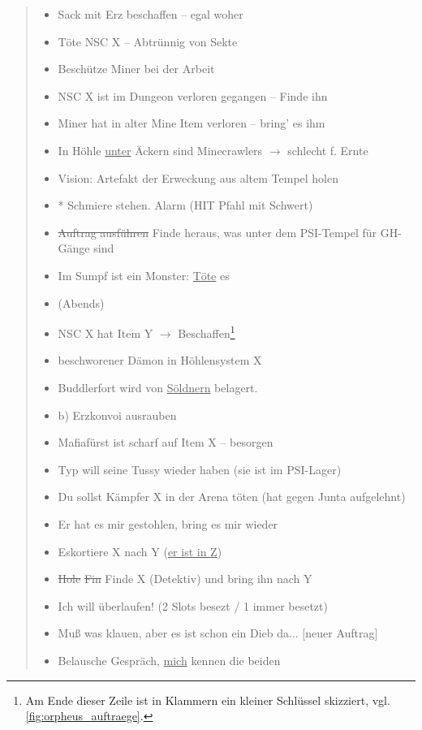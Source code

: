 \documentclass[a5paper,pagesize,numbers=noenddot]{scrbook}
\begin{document}
\begin{quote}
   \begin{itemize}
      \item[1)] Sack mit Erz beschaffen -- egal woher
      \item[2)] Töte NSC X -- Abtrünnig von Sekte
      \item[3)] Beschütze Miner bei der Arbeit
      \item[4)] NSC X ist im Dungeon verloren gegangen -- Finde ihn
      \item[5)] Miner hat in alter Mine Item verloren -- bring' es ihm
      \item[6)] In Höhle \uline{unter} Äckern sind Minecrawlers $\rightarrow$ schlecht f. Ernte
      \item[7)] Vision: Artefakt der Erweckung aus altem Tempel holen
      \item[8)] * Schmiere stehen. Alarm (HIT Pfahl mit Schwert)
      \item[9)] \sout{Auftrag ausführen} Finde heraus, was unter dem PSI-Tempel für GH-Gänge sind
      \item[10)] Im Sumpf ist ein Monster: \uline{Töte} es
      \item[] \phantom{Im Sumpf ist} (Abends)
      \item[11)] NSC X hat Item Y $\rightarrow$ Beschaffen\footnote{Am Ende dieser Zeile ist in Klammern ein kleiner Schlüssel skizziert, vgl. \autoref{fig:orpheus_auftraege}.}
      \item[12)] beschworener Dämon in Höhlensystem X
      \item[13)] Buddlerfort wird von \uline{Söldnern} belagert.
      \item[] \phantom{B}b) Erzkonvoi ausrauben
      \item[14)] Mafiafürst ist scharf auf Item X -- besorgen
      \item[15)] Typ will seine Tussy wieder haben (sie ist im PSI-Lager)
      \item[16)] Du sollst Kämpfer X in der Arena töten (hat gegen Junta aufgelehnt)
      \item[17)] Er hat es mir gestohlen, bring es mir wieder
      \item[18)] Eskortiere X nach Y (\uline{er ist in Z})
      \item[19)] \sout{Hole} \sout{Fin} Finde X (Detektiv) und bring ihn nach Y
      \item[20)] Ich will überlaufen! (2 Slots besezt / 1 immer besetzt)
      \item[21)] Muß was klauen, aber es ist schon ein Dieb da... [neuer Auftrag]
      \item[22)] Belausche Gespräch, \uline{mich} kennen die beiden
   \end{itemize}
\end{quote}
\end{document}
